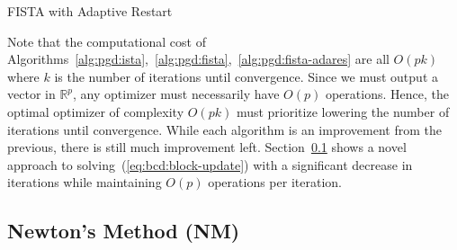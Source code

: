 \documentclass[fontsize=11pt]{article}
\newcommand{\R}{\mathbb{R}}
\begin{document}
\begin{algorithm}
    \caption{FISTA with Adaptive Restart}\label{alg:pgd:fista-adares}
\end{algorithm}

Note that the computational cost of 
Algorithms~\ref{alg:pgd:ista},~\ref{alg:pgd:fista},~\ref{alg:pgd:fista-adares}
are all $O(p k)$ where $k$ is the number of iterations until convergence.
Since we must output a vector in $\R^p$, 
any optimizer must necessarily have $O(p)$ operations.
Hence, the optimal optimizer of complexity $O(pk)$ must prioritize lowering 
the number of iterations until convergence.
While each algorithm is an improvement from the previous,
there is still much improvement left.
Section~\ref{ssec:newton} shows a novel approach to solving~(\ref{eq:bcd:block-update})
with a significant decrease in iterations while maintaining $O(p)$ operations per iteration.


\subsection{Newton's Method (NM)}\label{ssec:newton}
\end{document}
